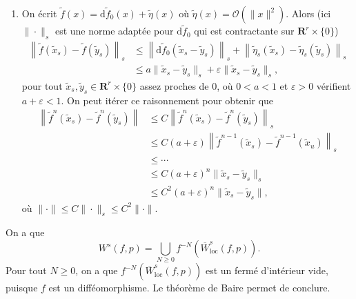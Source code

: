 \documentclass[a4paper,12pt,openany]{article}
\theoremstyle{plain}
\theoremstyle{definition}
\newcommand{\dd}{\mathrm{d}}
\newcommand{\R}{\mathbf{R}}
\begin{document}
\begin{enumerate}
\item On \'ecrit $\tilde f(x) = \dd \tilde f_0 (x) + \tilde \eta(x)$ o\`u $\tilde \eta(x) = \mathcal{O}(\|x\|^2).$ Alors (ici $\|\cdot\|_s$ est une norme adapt\'ee pour $\dd \tilde f_0$ qui est contractante sur $\R^r \times \{0\}$)
$$
\begin{aligned}
\left\|\tilde f(\tilde x_s) - \tilde f (\tilde y_s)\right\|_s &\leq \left\| \dd \tilde f_0(\tilde x_s - \tilde y_s) \right\|_s + \left\|\tilde \eta_s(\tilde x_s) - \tilde \eta_s(\tilde y _s)\right\|_s \\
& \leq a \|\tilde x_s - \tilde y_s\|_s + \varepsilon \|\tilde x_s - \tilde y_s\|_s,
\end{aligned}
$$
pour tout $\tilde x_s, \tilde y_s \in \R^r \times \{0\}$ assez proches de $0$, o\`u $0 < a < 1$ et $\varepsilon > 0$ v\'erifient $a + \varepsilon < 1.$ On peut it\'erer ce raisonnement pour obtenir que
$$
\begin{aligned}
\left\|\tilde f^n(\tilde x_s) - \tilde f^n(\tilde y_s)\right\| &\leq C \left\|\tilde f^n(\tilde x_s) - \tilde f^n(\tilde y_s)\right\|_s \\
&\leq C (a+\varepsilon) \left \|\tilde f^{n-1}(\tilde x_s) -\tilde f^{n-1}(\tilde x_u) \right\|_s \\
& \leq \cdots \\
& \leq C (a + \varepsilon)^n \|\tilde x_s - \tilde y_s\|_s \\
& \leq C^2 (a + \varepsilon)^n \|\tilde x_s - \tilde y_s\|,
\end{aligned}
$$
o\`u $\|\cdot\| \leq C \|\cdot\|_s \leq C^2 \|\cdot\|.$

\end{enumerate}

\vspace{0.6cm}

 \vspace{1.5mm} 

\noindent On a que 
$$
W^s(f,p) = \bigcup_{N \geq 0} f^{-N}\left(\overline{W}^s_\mathrm{loc}(f,p)\right).
$$
Pour tout $N \geq 0$, on a que $f^{-N}\left(\overline{W}^s_\mathrm{loc}(f,p)\right)$ est un ferm\'e d'int\'erieur vide, puisque $f$ est un diff\'eomorphisme. Le th\'eor\`eme de Baire permet de conclure.

\vspace{0.6cm}


 \vspace{1.5mm} 
\end{document}
